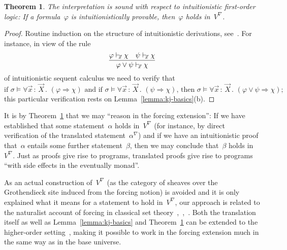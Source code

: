 \documentclass[com,11pt,crcready]{iosart2x}
\theoremstyle{definition}
\theoremstyle{plain}
\newtheorem{theorem}[definition]{Theorem}
\theoremstyle{remark}
\newcommand{\?}{\,{:}\,}
\newcommand{\seq}[1]{\mathrel{\vdash\!\!\!_{#1}}}
\newcommand{\forces}{\vDash}
\renewcommand{\_}{\mathpunct{.}\,}
\begin{document}
\begin{theorem}\label{thm:kj-sound}The interpretation is sound with respect to
intuitionistic first-order logic: If a formula~$\varphi$ is intuitionistically
provable, then~$\varphi$ holds in~$V^\nabla$.\end{theorem}

\begin{proof}Routine induction on the structure of intuitionistic derivations,
see~\cite[Sections~6.7,~6.8]{borceux:handbook3}. For instance, in view of the
rule
\[
  \infer{\varphi \vee \psi \seq{\vec x} \chi}{\varphi \seq{\vec x} \chi \quad
  \psi \seq{\vec x} \chi}
\]
of intuitionistic sequent calculus we need to verify that
\[
  \text{if
  $\sigma \forces \forall \vec x\?\vec X\_ (\varphi \Rightarrow \chi)$ and if
  $\sigma \forces \forall \vec x\?\vec X\_ (\psi \Rightarrow \chi)$, then
  $\sigma \forces \forall \vec x\?\vec X\_ (\varphi \vee \psi \Rightarrow \chi)$;
  }
\]
this particular verification rests on Lemma~\ref{lemma:kj-basics}(b).
\end{proof}

It is by Theorem~\ref{thm:kj-sound} that we may ``reason in the forcing
extension'': If we have established that some statement~$\alpha$ holds
in~$V^\nabla$ (for instance, by direct verification of the translated
statement~$\alpha^\nabla$) and if we have an intuitionistic proof that~$\alpha$
entails some further statement~$\beta$, then we may conclude that~$\beta$ holds
in~$V^\nabla$. Just as proofs give rise to programs, translated proofs give
rise to programs ``with side effects in the eventually monad''.

As an actual construction of~$V^\nabla$ (as the category of sheaves over the
Grothendieck site induced from the forcing notion) is avoided and it is only
explained what it means for a statement to hold in~$V^\nabla$, our approach is
related to the naturalist account of forcing in classical set
theory~\cite[Theorem~2]{hamkins:multiverse},~\cite[Section~4]{maddy-meadows:reconstruction},~\cite{barton:forcing}.
Both the translation itself as well as Lemma~\ref{lemma:kj-basics} and
Theorem~\ref{thm:kj-sound} can be extended to the higher-order
setting~\cite[Section~D4.1]{johnstone:elephant}, making it possible to work in the forcing extension much in
the same way as in the base universe.
\end{document}
